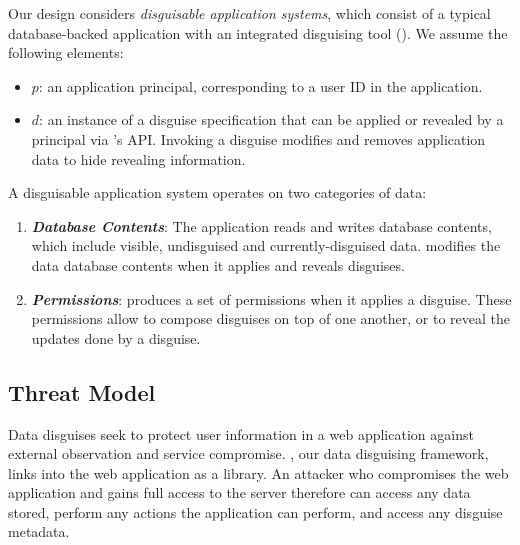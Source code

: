 Our design considers \emph{disguisable application systems}, which consist of a typical database-backed
application with an integrated disguising tool (\sys).
We assume the following elements:
\begin{itemize}
    \item $p$: an application principal, corresponding to a user ID in the application. 
    \item $d$: an instance of a disguise specification that can be applied or revealed by a principal via \sys's
        API. Invoking a disguise modifies and removes application data to hide revealing information.
\end{itemize}

\noindent
A disguisable application system operates on two categories of data:
\begin{enumerate}
    \item \emph{\textbf{Database Contents}}: The application reads and writes database
        contents, which include visible, undisguised and currently-disguised data.
        \sys modifies the data database contents when it applies and reveals disguises.
    \item \emph{\textbf{Permissions}}: \sys produces a set of permissions when it applies a
        disguise. These permissions allow \sys to compose disguises on top of one another, or to
        reveal the updates done by a disguise.
\end{enumerate}

\subsection{Threat Model}

%
Data disguises seek to protect user information in a web application against external observation
and service compromise.
%
\sys, our data disguising framework, links into the web application as a library.
%
An attacker who compromises the web application and gains full access to the server therefore
can access any data stored, perform any actions the application can perform, and access any
disguise metadata.
%

